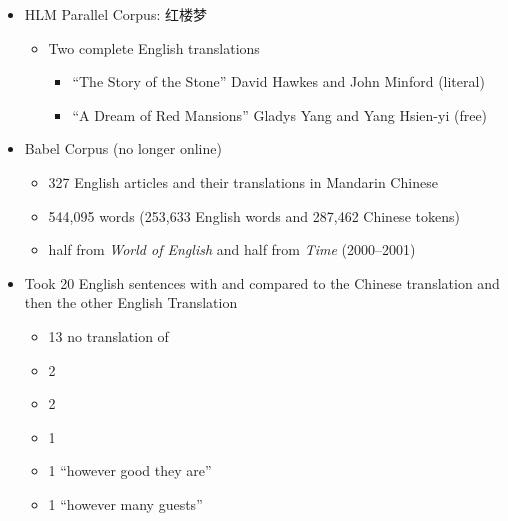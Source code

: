 \documentclass[a4paper,landscape,headrule,footrule,xetex]{foils}
\begin{document}
\MyLogo{}
\newcommand{\ZH}[1]{#1}
\begin{itemize}
\item HLM Parallel Corpus: \ZH{红楼梦} 
  \begin{itemize}
  \item Two complete English translations
    \begin{itemize}
    \item ``The Story of the Stone'' David Hawkes and John Minford \hfill (literal)
    \item ``A Dream of Red Mansions'' Gladys Yang and Yang Hsien-yi \hfill (free)
    \end{itemize}
  \end{itemize}
\item Babel Corpus (no longer online)
  \begin{itemize}
  \item 327 English articles and their translations in Mandarin Chinese
  \item 544,095 words (253,633 English words and 287,462 Chinese tokens)
  \item half  from \textit{World of English} and half from \textit{Time} (2000--2001)
  \end{itemize}
\end{itemize}

 \makexeCJKactive
\begin{itemize}
\item Took 20 English sentences with  and compared to the Chinese translation and then the other English Translation
  \begin{itemize}
  \item 13 no translation of 
  \item 2  
  \item 2  
  \item 1  
  \item 1  ``however good they are''
  \item 1  ``however many guests''
  \end{itemize}
\end{itemize}
 \makexeCJKinactive
{}
\end{document}
